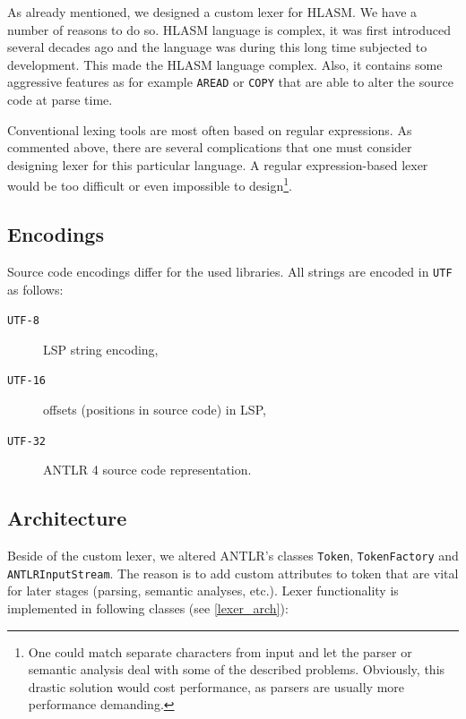 As already mentioned, we designed a custom lexer for HLASM. We have a number of reasons to do so. HLASM language is complex, it was first introduced several decades ago and the language was during this long time subjected to development. This made the HLASM language complex. Also, it contains some aggressive features as for example \texttt{AREAD} or \texttt{COPY} that are able to alter the source code at parse time.

Conventional lexing tools are most often based on regular expressions. As commented above, there are several complications that one must consider designing lexer for this particular language. A regular expression-based lexer would be too difficult or even impossible to design\footnote{One could match separate characters from input and let the parser or semantic analysis deal with some of the described problems. Obviously, this drastic solution would cost performance, as parsers are usually more performance demanding.}.

\subsection{Encodings}
Source code encodings differ for the used libraries. All strings are encoded in \texttt{UTF} as follows:

\begin{description}
	\item[\texttt{UTF-8}] LSP string encoding,
	\item[\texttt{UTF-16}] offsets (positions in source code) in LSP,
	\item[\texttt{UTF-32}] ANTLR 4 source code representation.
\end{description}

\subsection{Architecture}
Beside of the custom lexer, we altered ANTLR's classes \texttt{Token}, \texttt{TokenFactory} and \texttt{ANTLRInputStream}. The reason is to add custom attributes to token that are vital for later stages (parsing, semantic analyses, etc.). Lexer functionality is implemented in following classes (see \cref{lexer_arch}):

